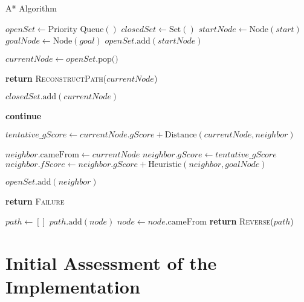 \documentclass[a4paper, 12pt]{article}
\begin{document}
	\begin{algorithm}
		\caption{A* Algorithm}
		\begin{algorithmic}[1]
			\State $openSet \gets \text{Priority Queue}()$
			\State $closedSet \gets \text{Set}()$
			\State $startNode \gets \text{Node}(start)$
			\State $goalNode \gets \text{Node}(goal)$
			\State $openSet.\text{add}(startNode)$
			
			\State $currentNode \gets openSet.\text{pop()}$  
			
			\State \textbf{return} \textsc{ReconstructPath}($currentNode$)
			\EndIf
			
			\State $closedSet.\text{add}(currentNode)$
			
			\State \textbf{continue}
			\EndIf
			
			\State $tentative\_gScore \gets currentNode.gScore + \text{Distance}(currentNode, neighbor)$
			
			\State $neighbor.\text{cameFrom} \gets currentNode$
			\State $neighbor.gScore \gets tentative\_gScore$
			\State $neighbor.fScore \gets neighbor.gScore + \text{Heuristic}(neighbor, goalNode)$
			
			\State $openSet.\text{add}(neighbor)$
			\EndIf
			\EndIf
			\EndFor
			\EndWhile
			
			\State \textbf{return} \textsc{Failure}
			\EndProcedure
			
			\State $path \gets []$
			\State $path.\text{add}(node)$
			\State $node \gets node.\text{cameFrom}$
			\EndWhile
			\State \textbf{return} \textsc{Reverse}($path$)
			\EndProcedure
		\end{algorithmic}
	\end{algorithm}
	
	\newpage

	
	
	
	
	\section*{Initial Assessment of the Implementation}
	
\end{document}
